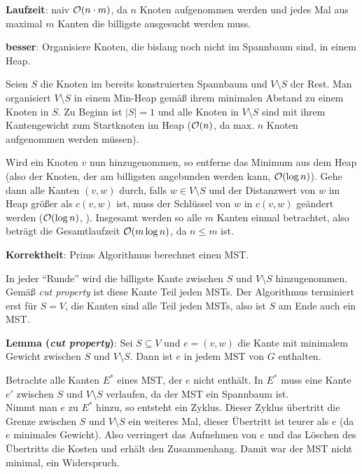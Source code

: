 \linie

\textbf{Laufzeit}:
naiv $\mathcal{O}(n \cdot m)$, da $n$ Knoten aufgenommen werden und jedes Mal
aus maximal $m$ Kanten die billigste ausgesucht werden muss.

\textbf{besser}:
Organisiere Knoten, die bislang noch nicht im Spannbaum sind,
in einem Heap.

Seien $S$ die Knoten im bereits konstruierten Spannbaum und $V \setminus S$
der Rest.
Man organisiert $V \setminus S$ in einem Min-Heap gemäß ihrem minimalen
Abstand zu einem Knoten in $S$.
Zu Beginn ist $|S| = 1$ und alle Knoten in $V \setminus S$ sind mit ihrem
Kantengewicht zum Startknoten im Heap ($\mathcal{O}(n)$, da max. $n$ Knoten aufgenommen
werden müssen).

Wird ein Knoten $v$ nun hinzugenommen, so entferne das Minimum aus dem Heap
(also der Knoten, der am billigsten angebunden werden kann, $\mathcal{O}(\log n)$).
Gehe dann alle Kanten $(v, w)$ durch, falls $w \in V \setminus S$ und
der Distanzwert von $w$ im Heap größer als $c(v, w)$ ist, muss
der Schlüssel von $w$ in $c(v, w)$ geändert werden
($\mathcal{O}(\log n)$, ).
Insgesamt werden so alle $m$ Kanten einmal betrachtet, also beträgt die
Gesamtlaufzeit $\mathcal{O}(m \log n)$, da $n \le m$ ist.

\linie

\textbf{Korrektheit}: Prims Algorithmus berechnet einen MST.

\begin{Beweis}
    In jeder "`Runde"' wird die billigste Kante zwischen $S$ und
    $V \setminus S$ hinzugenommen.
    Gemäß \emph{cut property} ist diese Kante Teil jeden MSTs.
    Der Algorithmus terminiert erst für $S = V$, die Kanten sind alle Teil
    jeden MSTs, also ist $S$ am Ende auch ein MST.
\end{Beweis}

\pagebreak

\textbf{Lemma (\emph{cut property})}:
Sei $S \subseteq V$ und $e = (v, w)$ die Kante mit minimalem Gewicht
zwischen $S$ und $V \setminus S$.
Dann ist $e$ in jedem MST von $G$ enthalten.

\begin{Beweis}
    Betrachte alle Kanten $E^\ast$ eines MST, der $e$ nicht enthält.
    In $E^\ast$ muss eine Kante $e'$ zwischen $S$ und $V \setminus S$
    verlaufen, da der MST ein Spannbaum ist. \\
    Nimmt man $e$ zu $E^\ast$ hinzu, so entsteht ein Zyklus.
    Dieser Zyklus übertritt die Grenze zwischen $S$ und $V \setminus S$
    ein weiteres Mal, dieser Übertritt ist teurer als $e$
    (da $e$ minimales Gewicht).
    Also verringert das Aufnehmen von $e$ und das Löschen des Übertritts
    die Kosten und erhält den Zusammenhang.
    Damit war der MST nicht minimal, ein Widerspruch.
\end{Beweis}

